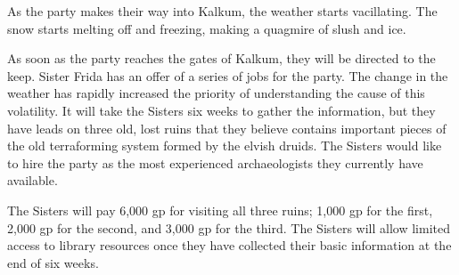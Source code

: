 As the party makes their way into Kalkum, the weather starts vacillating.
The snow starts melting off and freezing, making a quagmire of slush and ice.

As soon as the party reaches the gates of Kalkum, they will be directed to the keep.
Sister Frida has an offer of a series of jobs for the party.
The change in the weather has rapidly increased the priority of understanding the cause of this volatility.
It will take the Sisters six weeks to gather the information, but they have leads on three old, lost ruins that they believe contains important pieces of the old terraforming system formed by the elvish druids.
The Sisters would like to hire the party as the most experienced archaeologists they currently have available.

The Sisters will pay 6,000 gp for visiting all three ruins; 1,000 gp for the first, 2,000 gp for the second, and 3,000 gp for the third.
The Sisters will allow limited access to library resources once they have collected their basic information at the end of six weeks.
